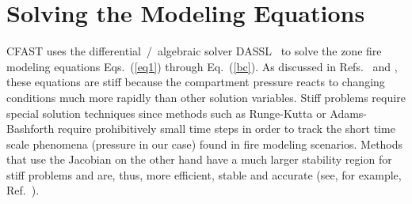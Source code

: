 \documentclass[12pt,twoside]{book}
\begin{document}
%
%

\chapter{Solving the Modeling Equations}
\label{chap:heatsolution}

CFAST uses the differential~/~algebraic solver DASSL~\cite{DASSL:1982,DASSL:1989} to solve the zone fire modeling equations Eqs.~(\ref{eq1}) through Eq.~(\ref{bc}).
As discussed in Refs.~\cite{Forney:1994} and \cite{Rehm:1992}, these equations are stiff because the compartment pressure reacts to changing conditions much more rapidly than other solution variables. Stiff problems require special solution techniques since methods such as Runge-Kutta or Adams-Bashforth require prohibitively small time steps in order to track the short time scale phenomena (pressure in our case) found in fire modeling scenarios. Methods that use the Jacobian on the other hand have a much larger stability region for stiff problems and are, thus, more efficient, stable and accurate (see, for example, Ref.~\cite{Numerical_Recipes}).
\end{document}
